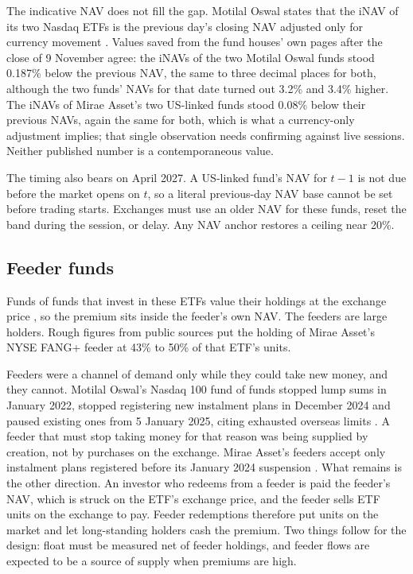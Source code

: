 \documentclass[10pt,journal,a4paper]{IEEEtran}
\theoremstyle{definition}
\begin{document}
The indicative NAV does not fill the gap. Motilal Oswal states that the iNAV of its two Nasdaq ETFs is the previous day's closing NAV adjusted only for currency movement \citep{motilal2026inav}. Values saved from the fund houses' own pages after the close of 9 November agree: the iNAVs of the two Motilal Oswal funds stood 0.187\% below the previous NAV, the same to three decimal places for both, although the two funds' NAVs for that date turned out 3.2\% and 3.4\% higher. The iNAVs of Mirae Asset's two US-linked funds stood 0.08\% below their previous NAVs, again the same for both, which is what a currency-only adjustment implies; that single observation needs confirming against live sessions. Neither published number is a contemporaneous value.

The timing also bears on April 2027. A US-linked fund's NAV for $t-1$ is not due before the market opens on $t$, so a literal previous-day NAV base cannot be set before trading starts. Exchanges must use an older NAV for these funds, reset the band during the session, or delay. Any NAV anchor restores a ceiling near 20\%.

\subsection{Feeder funds}
Funds of funds that invest in these ETFs value their holdings at the exchange price \citep{vr2026fof}, so the premium sits inside the feeder's own NAV. The feeders are large holders. Rough figures from public sources put the holding of Mirae Asset's NYSE FANG+ feeder at 43\% to 50\% of that ETF's units.

Feeders were a channel of demand only while they could take new money, and they cannot. Motilal Oswal's Nasdaq 100 fund of funds stopped lump sums in January 2022, stopped registering new instalment plans in December 2024 and paused existing ones from 5 January 2025, citing exhausted overseas limits \citep{et2025motilal}. A feeder that must stop taking money for that reason was being supplied by creation, not by purchases on the exchange. Mirae Asset's feeders accept only instalment plans registered before its January 2024 suspension \citep{mirae2024addendum}. What remains is the other direction. An investor who redeems from a feeder is paid the feeder's NAV, which is struck on the ETF's exchange price, and the feeder sells ETF units on the exchange to pay. Feeder redemptions therefore put units on the market and let long-standing holders cash the premium. Two things follow for the design: float must be measured net of feeder holdings, and feeder flows are expected to be a source of supply when premiums are high.
\end{document}
